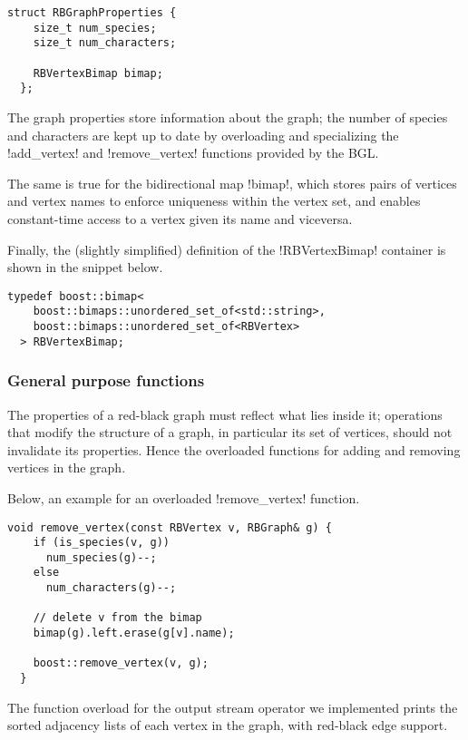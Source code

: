 \begin{lstlisting}[moreemph={RBVertexBimap}]
  struct RBGraphProperties {
    size_t num_species;
    size_t num_characters;

    RBVertexBimap bimap;
  };
\end{lstlisting}

The graph properties store information about the graph; the number of species and characters are kept up to date by overloading and specializing the !add_vertex! and !remove_vertex! functions provided by the BGL.

The same is true for the bidirectional map !bimap!, which stores pairs of vertices and vertex names to enforce uniqueness within the vertex set, and enables constant-time access to a vertex given its name and viceversa.

Finally, the (slightly simplified) definition of the !RBVertexBimap! container is shown in the snippet below.

\begin{lstlisting}[belowskip=0pt, moreemph={RBVertex}]
  typedef boost::bimap<
    boost::bimaps::unordered_set_of<std::string>,
    boost::bimaps::unordered_set_of<RBVertex>
  > RBVertexBimap;
\end{lstlisting}

\subsubsection*{General purpose functions}

The properties of a red-black graph must reflect what lies inside it; operations that modify the structure of a graph, in particular its set of vertices, should not invalidate its properties.
Hence the overloaded functions for adding and removing vertices in the graph.

Below, an example for an overloaded !remove_vertex! function.

\begin{lstlisting}[moreemph={RBVertex, RBGraph},
                   moreemph={[2] remove_vertex}]
  void remove_vertex(const RBVertex v, RBGraph& g) {
    if (is_species(v, g))
      num_species(g)--;
    else
      num_characters(g)--;

    // delete v from the bimap
    bimap(g).left.erase(g[v].name);

    boost::remove_vertex(v, g);
  }
\end{lstlisting}

The function overload for the output stream operator we implemented prints the sorted adjacency lists of each vertex in the graph, with red-black edge support.

